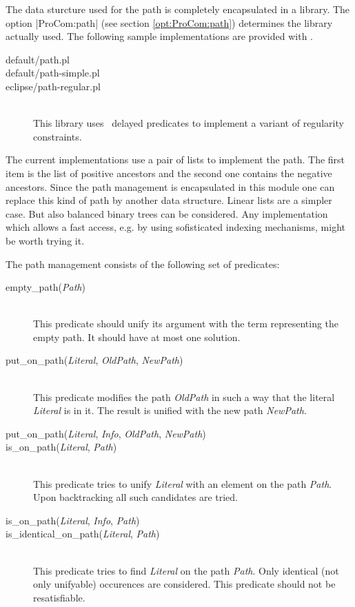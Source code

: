 The data sturcture used for the path is completely encapsulated in a library.
The option |ProCom:path| (see section \ref{opt:ProCom:path}) determines the
library actually used. The following sample implementations are provided with
\ProCom.
\begin{description}
  \item [default/path.pl]
  \item [default/path-simple.pl]
  \item [eclipse/path-regular.pl]\ \\
  This library uses \eclipse\ delayed predicates to implement a variant of
  regularity constraints.
\end{description}

The current implementations use a pair of lists to implement the path. The
first item is the list of positive ancestors and the second one contains the
negative ancestors.  Since the path management is encapsulated in this module
one can replace this kind of path by another data structure. Linear lists are
a simpler case. But also balanced binary trees can be considered. Any
implementation which allows a fast access, e.g. by using sofisticated indexing
mechanisms, might be worth trying it.

The path management consists of the following set of predicates:
\begin{description}
  \item [empty\_path({\em Path})]\ \\
  This predicate should unify its argument with the term representing the
  empty path. It should have at most one solution.

  \item [put\_on\_path({\em Literal}, {\em OldPath}, {\em
  NewPath})]\ \\
  This predicate modifies the path {\em OldPath} in such a way that the
  literal {\em Literal} is in it. The result is unified with the new path {\em
  NewPath}.

  \item [put\_on\_path({\em Literal}, {\em Info}, {\em OldPath}, {\em NewPath})]

  \item [is\_on\_path({\em Literal}, {\em Path})]\ \\
  This predicate tries to unify {\em Literal} with an element on the path {\em
  Path}. Upon backtracking all such candidates are tried.

  \item [is\_on\_path({\em Literal}, {\em Info}, {\em
  Path})]

  \item [is\_identical\_on\_path({\em Literal}, {\em
  Path})]\ \\
  This predicate tries to find {\em Literal} on the path {\em Path}. Only
  identical (not only unifyable) occurences are considered. This predicate
  should not be resatisfiable.
\end{description}



